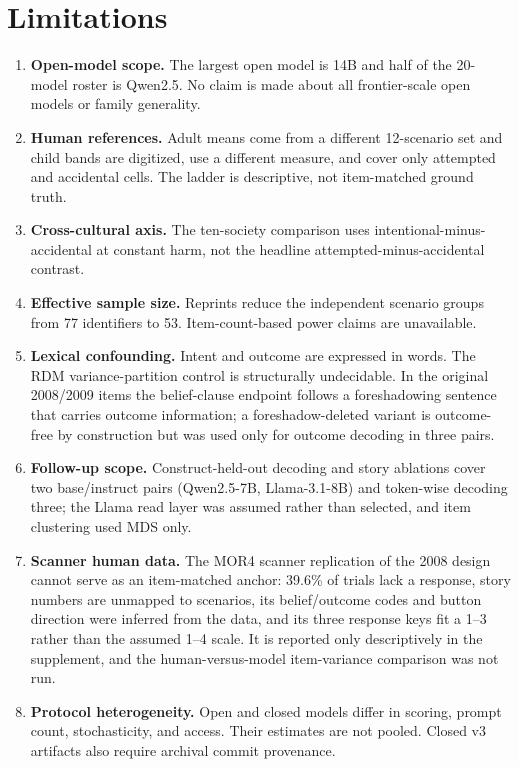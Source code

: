 \documentclass[11pt]{article}
\begin{document}
\section{Limitations}

\begin{enumerate}[leftmargin=*]
    \item \textbf{Open-model scope.} The largest open model is 14B and half of the 20-model roster is Qwen2.5. No claim is made about all frontier-scale open models or family generality.
    \item \textbf{Human references.} Adult means come from a different 12-scenario set and child bands are digitized, use a different measure, and cover only attempted and accidental cells. The ladder is descriptive, not item-matched ground truth.
    \item \textbf{Cross-cultural axis.} The ten-society comparison uses intentional-minus-accidental at constant harm, not the headline attempted-minus-accidental contrast.
    \item \textbf{Effective sample size.} Reprints reduce the independent scenario groups from 77 identifiers to 53. Item-count-based power claims are unavailable.
    \item \textbf{Lexical confounding.} Intent and outcome are expressed in words. The RDM variance-partition control is structurally undecidable. In the original 2008/2009 items the belief-clause endpoint follows a foreshadowing sentence that carries outcome information; a foreshadow-deleted variant is outcome-free by construction but was used only for outcome decoding in three pairs.
    \item \textbf{Follow-up scope.} Construct-held-out decoding and story ablations cover two base/instruct pairs (Qwen2.5-7B, Llama-3.1-8B) and token-wise decoding three; the Llama read layer was assumed rather than selected, and item clustering used MDS only.
    \item \textbf{Scanner human data.} The MOR4 scanner replication of the 2008 design cannot serve as an item-matched anchor: 39.6\% of trials lack a response, story numbers are unmapped to scenarios, its belief/outcome codes and button direction were inferred from the data, and its three response keys fit a 1--3 rather than the assumed 1--4 scale. It is reported only descriptively in the supplement, and the human-versus-model item-variance comparison was not run.
    \item \textbf{Protocol heterogeneity.} Open and closed models differ in scoring, prompt count, stochasticity, and access. Their estimates are not pooled. Closed v3 artifacts also require archival commit provenance.

\end{enumerate}
\end{document}
